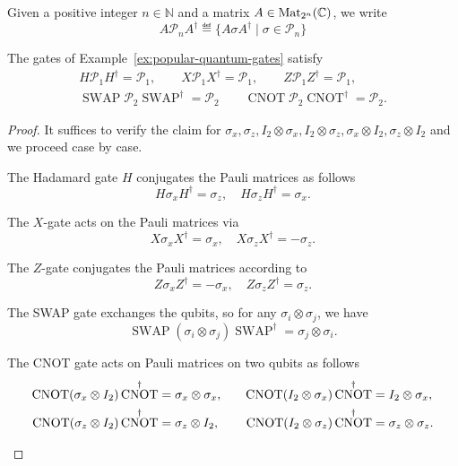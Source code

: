 \documentclass[a4paper, oneside, 12pt]{amsart}
\DeclareMathOperator{\SWAP}{SWAP}
\DeclareMathOperator{\CNOT}{CNOT}
\newcommand*{\PauliGroup}{\ensuremath{\mathcal{P}}}
\begin{document}
Given a positive integer \(n\in \mathbb{N}\) and a matrix \(A\in \operatorname{Mat}_{2^{n}}( \mathbb{C})\), we write
\begin{equation*}
  A\PauliGroup_{n}A^{\dagger} \eqdef \{ A\sigma A^{\dagger} \mid \sigma \in \PauliGroup_{n}\}
\end{equation*}

\begin{lemma}\label{lem:clifford-gates}
  The gates of Example~\ref{ex:popular-quantum-gates} satisfy
  \begin{gather*}
    H\PauliGroup_{1} H^{\dagger}= \PauliGroup_{1}, \qquad
    X \PauliGroup_{1} X^{\dagger}= \PauliGroup_{1},\qquad
    Z \PauliGroup_{1}Z^{\dagger} = \PauliGroup_{1}, \\
    \SWAP \PauliGroup_{2} \SWAP^{\dagger} = \PauliGroup_{2} \qquad
    \CNOT \PauliGroup_{2} \CNOT^{\dagger} = \PauliGroup_{2}.
  \end{gather*}
\end{lemma}
\begin{proof}
  It suffices to verify the claim for
  \(\sigma_{x}, \sigma_{z}, I_{2}\otimes \sigma_{x}, I_{2}\otimes \sigma_{z}, \sigma_{x}\otimes I_{2}, \sigma_{z}\otimes I_{2}\) and we proceed case by case.
  \begin{thmlist}
    \item The Hadamard gate \( H \) conjugates the Pauli matrices as follows
    \begin{equation*}
      H \sigma_x H^\dagger = \sigma_z, \quad H \sigma_z H^\dagger = \sigma_x.
    \end{equation*}
    \item The \( X \)-gate acts on the Pauli matrices via
    \begin{equation*}
      X \sigma_x X^\dagger = \sigma_x, \quad X \sigma_z X^\dagger = -\sigma_z.
    \end{equation*}
    \item The \( Z \)-gate conjugates the Pauli matrices according to
    \begin{equation*}
      Z \sigma_x Z^\dagger = -\sigma_x, \quad Z \sigma_z Z^\dagger = \sigma_z.
    \end{equation*}
    \item The SWAP gate exchanges the qubits, so for any \( \sigma_i \otimes \sigma_j \), we have
    \begin{equation*}
      \SWAP (\sigma_i \otimes \sigma_j) \SWAP^\dagger = \sigma_j \otimes \sigma_i.
    \end{equation*}
    \item The CNOT gate acts on Pauli matrices on two qubits as follows
    \begin{align*}
      \CNOT (\sigma_x \otimes I_2) \CNOT^\dagger &= \sigma_x \otimes\sigma_{x},  \quad &\CNOT (I_2 \otimes \sigma_x) \CNOT^\dagger &= I_2 \otimes \sigma_x, \\
      \CNOT (\sigma_z \otimes I_2) \CNOT^\dagger &= \sigma_z \otimes I_2, \quad  &\CNOT (I_2 \otimes \sigma_z) \CNOT^\dagger &= \sigma_z \otimes \sigma_z. \qedhere
    \end{align*}
  \end{thmlist}
\end{proof}
\end{document}
